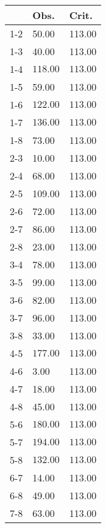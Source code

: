 \begin{table}[ht]
\centering
\begin{tabular}{rll}
  \hline
 & Obs. & Crit. \\ 
  \hline
1-2 & 50.00 & 113.00 \\ 
  1-3 & 40.00 & 113.00 \\ 
  1-4 & \(\mathbf{118.00}\) & \(\mathbf{113.00}\) \\ 
  1-5 & 59.00 & 113.00 \\ 
  1-6 & \(\mathbf{122.00}\) & \(\mathbf{113.00}\) \\ 
  1-7 & \(\mathbf{136.00}\) & \(\mathbf{113.00}\) \\ 
  1-8 & 73.00 & 113.00 \\ 
  2-3 & 10.00 & 113.00 \\ 
  2-4 & 68.00 & 113.00 \\ 
  2-5 & 109.00 & 113.00 \\ 
  2-6 & 72.00 & 113.00 \\ 
  2-7 & 86.00 & 113.00 \\ 
  2-8 & 23.00 & 113.00 \\ 
  3-4 & 78.00 & 113.00 \\ 
  3-5 & 99.00 & 113.00 \\ 
  3-6 & 82.00 & 113.00 \\ 
  3-7 & 96.00 & 113.00 \\ 
  3-8 & 33.00 & 113.00 \\ 
  4-5 & \(\mathbf{177.00}\) & \(\mathbf{113.00}\) \\ 
  4-6 & 3.00 & 113.00 \\ 
  4-7 & 18.00 & 113.00 \\ 
  4-8 & 45.00 & 113.00 \\ 
  5-6 & \(\mathbf{180.00}\) & \(\mathbf{113.00}\) \\ 
  5-7 & \(\mathbf{194.00}\) & \(\mathbf{113.00}\) \\ 
  5-8 & \(\mathbf{132.00}\) & \(\mathbf{113.00}\) \\ 
  6-7 & 14.00 & 113.00 \\ 
  6-8 & 49.00 & 113.00 \\ 
  7-8 & 63.00 & 113.00 \\ 
   \hline
\end{tabular}
\end{table}
